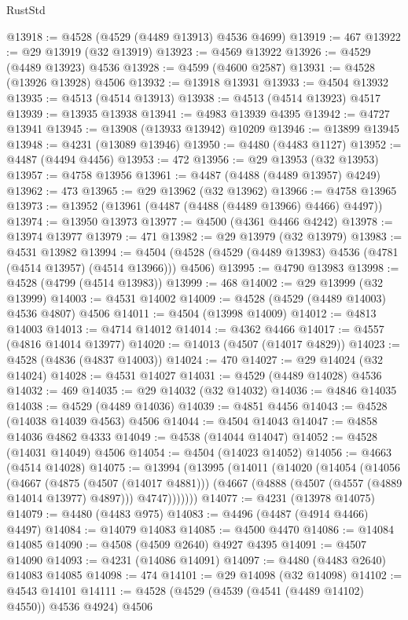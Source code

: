 \begin{lexlean}{RustStd}
\begin{coremodule}
@13918 := @4528 (@4529 (@4489 @13913) @4536 @4699)
@13919 := 467
@13922 := @29 @13919 (@32 @13919)
@13923 := @4569 @13922
@13926 := @4529 (@4489 @13923) @4536
@13928 := @4599 (@4600 @2587)
@13931 := @4528 (@13926 @13928) @4506
@13932 := @13918 @13931
@13933 := @4504 @13932
@13935 := @4513 (@4514 @13913)
@13938 := @4513 (@4514 @13923) @4517
@13939 := @13935 @13938
@13941 := @4983 @13939 @4395
@13942 := @4727 @13941
@13945 := @13908 (@13933 @13942) @10209
@13946 := @13899 @13945
@13948 := @4231 (@13089 @13946)
@13950 := @4480 (@4483 @1127)
@13952 := @4487 (@4494 @4456)
@13953 := 472
@13956 := @29 @13953 (@32 @13953)
@13957 := @4758 @13956
@13961 := @4487 (@4488 (@4489 @13957) @4249)
@13962 := 473
@13965 := @29 @13962 (@32 @13962)
@13966 := @4758 @13965
@13973 := @13952 (@13961 (@4487 (@4488 (@4489 @13966) @4466) @4497))
@13974 := @13950 @13973
@13977 := @4500 (@4361 @4466 @4242)
@13978 := @13974 @13977
@13979 := 471
@13982 := @29 @13979 (@32 @13979)
@13983 := @4531 @13982
@13994 := @4504 (@4528 (@4529 (@4489 @13983) @4536 (@4781 (@4514 @13957) (@4514 @13966))) @4506)
@13995 := @4790 @13983
@13998 := @4528 (@4799 (@4514 @13983))
@13999 := 468
@14002 := @29 @13999 (@32 @13999)
@14003 := @4531 @14002
@14009 := @4528 (@4529 (@4489 @14003) @4536 @4807) @4506
@14011 := @4504 (@13998 @14009)
@14012 := @4813 @14003
@14013 := @4714 @14012
@14014 := @4362 @4466
@14017 := @4557 (@4816 @14014 @13977)
@14020 := @14013 (@4507 (@14017 @4829))
@14023 := @4528 (@4836 (@4837 @14003))
@14024 := 470
@14027 := @29 @14024 (@32 @14024)
@14028 := @4531 @14027
@14031 := @4529 (@4489 @14028) @4536
@14032 := 469
@14035 := @29 @14032 (@32 @14032)
@14036 := @4846 @14035
@14038 := @4529 (@4489 @14036)
@14039 := @4851 @4456
@14043 := @4528 (@14038 @14039 @4563) @4506
@14044 := @4504 @14043
@14047 := @4858 @14036 @4862 @4333
@14049 := @4538 (@14044 @14047)
@14052 := @4528 (@14031 @14049) @4506
@14054 := @4504 (@14023 @14052)
@14056 := @4663 (@4514 @14028)
@14075 := @13994
    (@13995
      (@14011
        (@14020
          (@14054
            (@14056
              (@4667
                (@4875 (@4507 (@14017 @4881)))
                (@4667 (@4888 (@4507 (@4557 (@4889 @14014 @13977) @4897))) @4747)))))))
@14077 := @4231 (@13978 @14075)
@14079 := @4480 (@4483 @975)
@14083 := @4496 (@4487 (@4914 @4466) @4497)
@14084 := @14079 @14083
@14085 := @4500 @4470
@14086 := @14084 @14085
@14090 := @4508 (@4509 @2640) @4927 @4395
@14091 := @4507 @14090
@14093 := @4231 (@14086 @14091)
@14097 := @4480 (@4483 @2640) @14083 @14085
@14098 := 474
@14101 := @29 @14098 (@32 @14098)
@14102 := @4543 @14101
@14111 := @4528 (@4529 (@4539 (@4541 (@4489 @14102) @4550)) @4536 @4924) @4506

\end{coremodule}
\end{lexlean}
